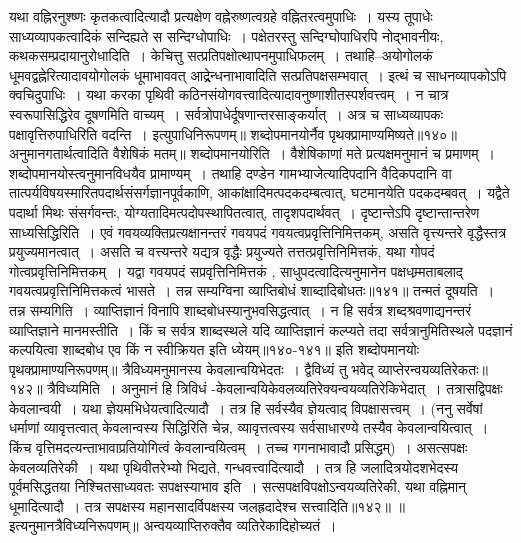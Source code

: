 यथा वह्निरनुश्ष्णः कृतकत्वादित्यादौ प्रत्यक्षेण वह्नेरुष्णत्वग्रहे वह्नितरत्वमुपाधिः~। यस्य तूपाधेः साध्यव्यापकत्वादिकं सन्दिह्यते स सन्दिग्धोपाधिः~। पक्षेतरस्तु
सन्दिग्घोपाधिरपि नोद्भावनीयः, कथकसम्प्रदायानुरोधादिति~।
केचित्तु सत्प्रतिपक्षोत्थापनमुपाधिफलम्~। तथाहि--अयोगोलकं धूमवद्वह्नेरित्यादावयोगोलकं धूमाभाववत् आद्र्रेन्धनाभावादिति सत्प्रतिपक्षसम्भवात्~। इत्थं च
साधनव्यापकोऽपि क्वचिदुपाधिः~। यथा करका पृथिवी कठिनसंयोगवत्त्वादित्यादावनुष्णाशीतस्पर्शवत्त्वम्~। न चात्र स्वरूपासिद्धिरेव दूषणमिति वाच्यम्~। सर्वत्रोपाधेर्दूषणान्तरसाङ्कर्यात्~।
अत्र च साध्यव्यापकः पक्षावृत्तिरुपाधिरिति वदन्ति~। इत्युपाधिनिरूपणम्॥
शब्दोपमानयोर्नैव पृथक्प्रामाण्यमिष्यते॥१४०॥
अनुमानगतार्थत्वादिति वैशेषिकं मतम्॥
शब्दोपमानयोरिति~। वैशेषिकाणां मते प्रत्यक्षमनुमानं च प्रमाणम्~। शब्दोपमानयोस्त्वनुमानविधयैव प्रामाण्यम्~। तथाहि दण्डेन गामभ्याजेत्यादिपदानि वैदिकपदानि वा
तात्पर्यविषयस्मारितपदार्थसंसर्गज्ञानपूर्वकाणि, आकांक्षादिमत्पदकदम्बत्वात्, घटमानयेति पदकदम्बवत्~।
यद्वैते पदार्था मिथः संसर्गवन्तः, योग्यतादिमत्पदोपस्थापितत्वात्, तादृशपदार्थवत्~। दृष्टान्तेऽपि दृष्टान्तान्तरेण साध्यसिद्धिरिति~। एवं गवयव्यक्तिप्रत्यक्षानन्तरं गवयपदं
गवयत्वप्रवृत्तिनिमित्तकम्, असति वृत्त्यन्तरे वृद्धैस्तत्र प्रयुज्यमानत्वात्~। असति च वत्त्यन्तरे यद्यत्र वृद्धैः प्रयुज्यते तत्तत्प्रवृत्तिनिमित्तकं, यथा गोपदं गोत्वप्रवृत्तिनिमित्तकम्~।
यद्वा गवयपदं सप्रवृत्तिनिमित्तकं , साधुपदत्वादित्यनुमानेन पक्षधम्र्मताबलाद् गवयत्वप्रवृत्तिनिमित्तकत्वं भासते~।
तन्न सम्यग्विना व्याप्तिबोधं शाब्दादिबोधतः॥१४१॥
तन्मतं दूषयति~। तन्न सम्यगिति~। व्याप्तिज्ञानं विनापि शाब्दबोधस्यानुभवसिद्धत्वात्~। न हि सर्वत्र शब्दश्रवणाद्यनन्तरं व्याप्तिज्ञाने मानमस्तीति~। किं च सर्वत्र
शाब्दस्थले यदि व्याप्तिज्ञानं कल्प्यते तदा सर्वत्रानुमितिस्थले पदज्ञानं कल्पयित्वा शाब्दबोध एव किं न स्वीक्रियत इति ध्येयम्॥१४०-१४१॥
इति शब्दोपमानयोः पृथक्प्रामाण्यनिरूपणम्॥
त्रैविध्यमनुमानस्य केवलान्वयिभेदतः~।
द्वैविध्यं तु भवेद् व्याप्तेरन्वयव्यतिरेकतः॥१४२॥
त्रैविध्यमिति~। अनुमानं हि त्रिविधं -केवलान्वयिकेवलव्यतिरेक्यन्वयव्यतिरेकिभेदात्~। तत्रासद्विपक्षः केवलान्वयी~। यथा ज्ञेयमभिधेयत्वादित्यादौ~। तत्र हि सर्वस्यैव
ज्ञेयत्वाद् विपक्षासत्त्वम्~। (ननु सर्वेषां धर्माणां व्यावृत्तत्वात् केवलान्वस्य सिद्धिरिति चेन्न, व्यावृत्तत्वस्य सर्वसाधारण्ये तस्यैव केवलान्वयित्वात्~। किंच वृत्तिमदत्यन्ताभावाप्रतियोगित्वं
केवलान्वयित्वम्~। तच्च गगनाभावादौ प्रसिद्धम्)~। असत्सपक्षः केवलव्यतिरेकी~। यथा पृथिवीतरेभ्यो भिद्यते, गन्धवत्त्वादित्यादौ~। तत्र हि जलादित्रयोदशभेदस्य पूर्वमसिद्धतया
निश्चितसाध्यवतः सपक्षस्याभाव इति~। सत्सपक्षविपक्षोऽन्वयव्यतिरेकी, यथा वह्निमान् धूमादित्यादौ~। तत्र सपक्षस्य महानसादर्विपक्षस्य जलह्रदादेश्च सत्त्वादिति॥१४२॥
॥इत्यनुमानत्रैविध्यनिरूपणम्॥
अन्वयव्याप्तिरुक्तैव व्यतिरेकादिहोच्यतं~।
